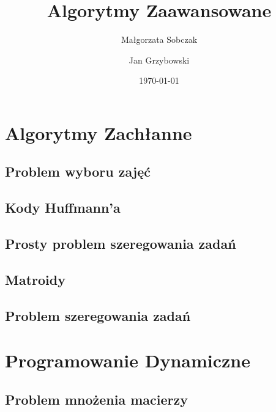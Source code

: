 \documentclass[11pt,a4paper]{article}
\begin{document}
                  

\title{Algorytmy Zaawansowane}
\author{Małgorzata Sobczak \and Jan Grzybowski}
\date{\today}

\maketitle 
                
\clearpage

\tableofcontents
\clearpage

\section{Algorytmy Zachłanne}


\subsection{Problem wyboru zajęć}


\subsection{Kody Huffmann'a}


\subsection{Prosty problem szeregowania zadań}


\subsection{Matroidy}


\subsection{Problem szeregowania zadań}


\section{Programowanie Dynamiczne}


\subsection{Problem mnożenia macierzy}

\end{document}
